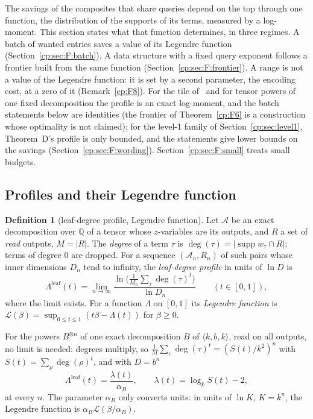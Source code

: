 \documentclass[11pt]{article}
\theoremstyle{definition}
\newtheorem{definition}[theorem]{Definition}
\theoremstyle{remark}
\providecommand{\Q}{\mathbb{Q}}
\newcommand{\abs}[1]{\lvert #1\rvert}
\DeclareMathOperator{\supp}{supp}
\newcommand{\mat}[3]{\langle #1,#2,#3\rangle} %
\newcommand{\alB}{\alpha_B}                   %
\newcommand{\ThmD}{Theorem~D}                               %
\newcommand{\Lleaf}{\Lambda^{\mathrm{leaf}}}          %
\newcommand{\Leg}{\mathcal{L}}                        %
\begin{document}
The savings of the composites that share queries depend on the top through one function, the distribution of the supports of its terms, measured by a log-moment. This section states what that function determines, in three regimes. A batch of wanted entries saves a value of its Legendre function (Section~\ref{cp:sec:F:batch}). A data structure with a fixed query exponent follows a frontier built from the same function (Section~\ref{cp:sec:F:frontier}). A range is not a value of the Legendre function: it is set by a second parameter, the encoding cost, at a zero of it (Remark~\ref{cp:F8}). For the tile of~\cite{v2} and for tensor powers of one fixed decomposition the profile is an exact log-moment, and the batch statements below are identities (the frontier of Theorem~\ref{cp:F6} is a construction whose optimality is not claimed); for the level-1 family of Section~\ref{cp:sec:level1}, \ThmD{}'s profile is only bounded, and the statements give lower bounds on the savings (Section~\ref{cp:sec:F:wording}). Section~\ref{cp:sec:F:small} treats small budgets.

\subsection{Profiles and their Legendre function}\label{cp:sec:F:def}

\begin{definition}[leaf-degree profile, Legendre function]\label{cp:F1}
Let $\mathcal A$ be an exact decomposition over $\Q$ of a tensor whose $z$-variables are its outputs, and $R$ a set of \emph{read} outputs, $M=\abs R$. The \emph{degree} of a term $\tau$ is $\deg(\tau)=\abs{\supp w_\tau\cap R}$; terms of degree $0$ are dropped. For a sequence $(\mathcal A_n,R_n)$ of such pairs whose inner dimensions $D_n$ tend to infinity, the \emph{leaf-degree profile} in units of $\ln D$ is
\[
\Lleaf(t)=\lim_{n\to\infty}\frac{\ln\bigl(\frac1{M_n}\sum_\tau\deg(\tau)^t\bigr)}{\ln D_n}\qquad(t\in[0,1]),
\]
where the limit exists. For a function $\Lambda$ on $[0,1]$ its \emph{Legendre function} is $\Leg(\beta)=\sup_{0\le t\le1}(t\beta-\Lambda(t))$ for $\beta\ge0$.
\end{definition}

For the powers $B^{\otimes n}$ of one exact decomposition $B$ of $\mat kbk$, read on all outputs, no limit is needed: degrees multiply, so $\frac1M\sum_\tau\deg(\tau)^t=(S(t)/k^2)^n$ with $S(t)=\sum_\rho\deg(\rho)^t$, and with $D=b^n$
\[
\Lleaf(t)=\frac{\lambda(t)}{\alB},\qquad\lambda(t)=\log_kS(t)-2,
\]
at every $n$. The parameter $\alB$ only converts units: in units of $\ln K$, $K=k^n$, the Legendre function is $\alB\Leg(\beta/\alB)$.
\end{document}
